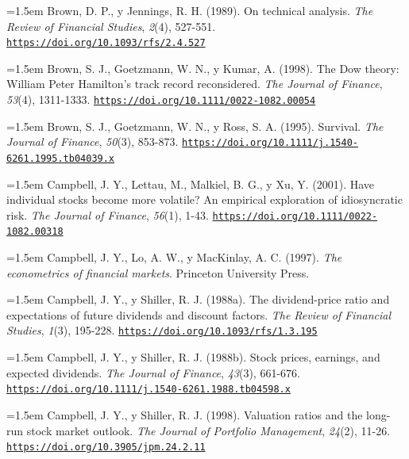 \documentclass[10pt,a4paper]{article}
\begin{document}
\noindent\hangindent=1.5em Brown, D. P., y Jennings, R. H. (1989). On technical analysis. \textit{The Review of Financial Studies}, \textit{2}(4), 527-551. \href{https://doi.org/10.1093/rfs/2.4.527}{\nolinkurl{https://doi.org/10.1093/rfs/2.4.527}}

\noindent\hangindent=1.5em Brown, S. J., Goetzmann, W. N., y Kumar, A. (1998). The Dow theory: William Peter Hamilton's track record reconsidered. \textit{The Journal of Finance}, \textit{53}(4), 1311-1333. \href{https://doi.org/10.1111/0022-1082.00054}{\nolinkurl{https://doi.org/10.1111/0022-1082.00054}}

\noindent\hangindent=1.5em Brown, S. J., Goetzmann, W. N., y Ross, S. A. (1995). Survival. \textit{The Journal of Finance}, \textit{50}(3), 853-873. \href{https://doi.org/10.1111/j.1540-6261.1995.tb04039.x}{\nolinkurl{https://doi.org/10.1111/j.1540-6261.1995.tb04039.x}}

\noindent\hangindent=1.5em Campbell, J. Y., Lettau, M., Malkiel, B. G., y Xu, Y. (2001). Have individual stocks become more volatile? An empirical exploration of idiosyncratic risk. \textit{The Journal of Finance}, \textit{56}(1), 1-43. \href{https://doi.org/10.1111/0022-1082.00318}{\nolinkurl{https://doi.org/10.1111/0022-1082.00318}}

\noindent\hangindent=1.5em Campbell, J. Y., Lo, A. W., y MacKinlay, A. C. (1997). \textit{The econometrics of financial markets}. Princeton University Press.

\noindent\hangindent=1.5em Campbell, J. Y., y Shiller, R. J. (1988a). The dividend-price ratio and expectations of future dividends and discount factors. \textit{The Review of Financial Studies}, \textit{1}(3), 195-228. \href{https://doi.org/10.1093/rfs/1.3.195}{\nolinkurl{https://doi.org/10.1093/rfs/1.3.195}}

\noindent\hangindent=1.5em Campbell, J. Y., y Shiller, R. J. (1988b). Stock prices, earnings, and expected dividends. \textit{The Journal of Finance}, \textit{43}(3), 661-676. \href{https://doi.org/10.1111/j.1540-6261.1988.tb04598.x}{\nolinkurl{https://doi.org/10.1111/j.1540-6261.1988.tb04598.x}}

\noindent\hangindent=1.5em Campbell, J. Y., y Shiller, R. J. (1998). Valuation ratios and the long-run stock market outlook. \textit{The Journal of Portfolio Management}, \textit{24}(2), 11-26. \href{https://doi.org/10.3905/jpm.24.2.11}{\nolinkurl{https://doi.org/10.3905/jpm.24.2.11}}
\end{document}
